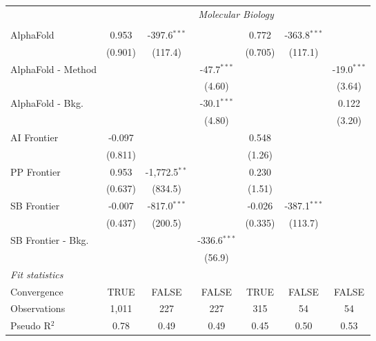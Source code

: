 \begin{tabular}{lcccccc}
 & \multicolumn{6}{c}{\textit{Molecular Biology}} \\ \\
   AlphaFold          & 0.953   & -397.6$^{***}$  &                & 0.772   & -363.8$^{***}$ &   \\   
                      & (0.901) & (117.4)         &                & (0.705) & (117.1)        &   \\   
   AlphaFold - Method &         &                 & -47.7$^{***}$  &         &                & -19.0$^{***}$\\   
                      &         &                 & (4.60)         &         &                & (3.64)\\   
   AlphaFold - Bkg.   &         &                 & -30.1$^{***}$  &         &                & 0.122\\   
                      &         &                 & (4.80)         &         &                & (3.20)\\   
   AI Frontier        & -0.097  &                 &                & 0.548   &                &   \\   
                      & (0.811) &                 &                & (1.26)  &                &   \\   
   PP Frontier        & 0.953   & -1,772.5$^{**}$ &                & 0.230   &                &   \\   
                      & (0.637) & (834.5)         &                & (1.51)  &                &   \\   
   SB Frontier        & -0.007  & -817.0$^{***}$  &                & -0.026  & -387.1$^{***}$ &   \\   
                      & (0.437) & (200.5)         &                & (0.335) & (113.7)        &   \\   
   SB Frontier - Bkg. &         &                 & -336.6$^{***}$ &         &                &   \\   
                      &         &                 & (56.9)         &         &                &   \\   
   \midrule
   \emph{Fit statistics}\\
   Convergence        &TRUE     & FALSE           & FALSE          & TRUE    & FALSE          & FALSE\\  
   Observations       & 1,011   & 227             & 227            & 315     & 54             & 54\\  
   Pseudo R$^2$       & 0.78    & 0.49            & 0.49           & 0.45    & 0.50           & 0.53\\  
   

\end{tabular}
